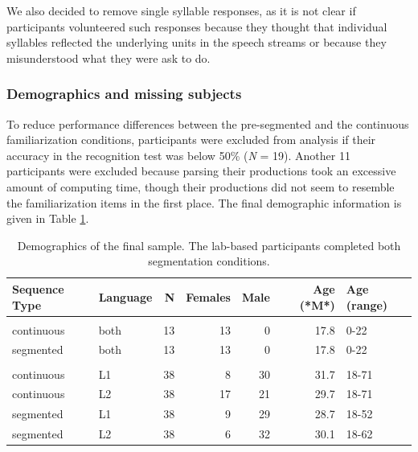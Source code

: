 \documentclass[
]{article}
\begin{document}
We also decided to remove single syllable responses, as it is not clear
if participants volunteered such responses because they thought that
individual syllables reflected the underlying units in the speech
streams or because they misunderstood what they were ask to do.

\hypertarget{demographics-and-missing-subjects}{%
\subsubsection{Demographics and missing
subjects}\label{demographics-and-missing-subjects}}

To reduce performance differences between the pre-segmented and the
continuous familiarization conditions, participants were excluded from
analysis if their accuracy in the recognition test was below 50\%
(\emph{N} = 19). Another 11 participants were excluded because parsing
their productions took an excessive amount of computing time, though
their productions did not seem to resemble the familiarization items in
the first place. The final demographic information is given in Table
\ref{tab:recall-final-demographics-print}.

\begin{table}

\caption{\label{tab:recall-final-demographics-print}Demographics of the final sample. The lab-based participants completed both segmentation conditions.}
\centering
\begin{tabular}[t]{llrrrrl}
\toprule
Sequence Type & Language & N & Females & Male & Age (*M*) & Age (range)\\
\midrule
\addlinespace[0.3em]
\multicolumn{7}{l}{\textbf{Lab-based}}\\
\hspace{1em}continuous & both & 13 & 13 & 0 & 17.8 & 0-22\\
\hspace{1em}segmented & both & 13 & 13 & 0 & 17.8 & 0-22\\
\addlinespace[0.3em]
\multicolumn{7}{l}{\textbf{Online}}\\
\hspace{1em}continuous & L1 & 38 & 8 & 30 & 31.7 & 18-71\\
\hspace{1em}continuous & L2 & 38 & 17 & 21 & 29.7 & 18-71\\
\hspace{1em}segmented & L1 & 38 & 9 & 29 & 28.7 & 18-52\\
\hspace{1em}segmented & L2 & 38 & 6 & 32 & 30.1 & 18-62\\
\bottomrule
\end{tabular}
\end{table}
\end{document}
